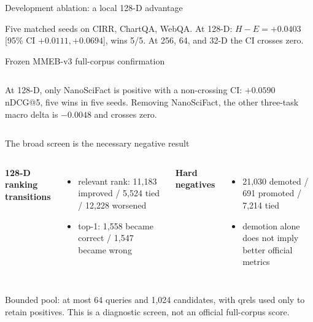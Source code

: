 \documentclass[aspectratio=169,10pt]{beamer}
\begin{document}
\begin{frame}{Development ablation: a local 128-D advantage}
\centering

\vspace{-0.8em}
\small Five matched seeds on CIRR, ChartQA, WebQA. At 128-D: $H-E=+0.0403$
[95\% CI $+0.0111,+0.0694$], wins 5/5. At 256, 64, and 32-D the CI crosses zero.
\end{frame}

\begin{frame}{Frozen MMEB-v3 full-corpus confirmation}
\begin{columns}[c]
\centering
{}
\centering\scriptsize
\vspace{0.8em}

\raggedright\small At 128-D, only NanoSciFact is positive with a non-crossing CI:
$+0.0590$ nDCG@5, five wins in five seeds. Removing NanoSciFact, the other three-task
macro delta is $-0.0048$ and crosses zero.
\end{columns}
\end{frame}

\begin{frame}{The broad screen is the necessary negative result}
\centering\small


\vspace{1em}
\begin{columns}[T]
\textbf{128-D ranking transitions}
\begin{itemize}
\item relevant rank: 11,183 improved / 5,524 tied / 12,228 worsened
\item top-1: 1,558 became correct / 1,547 became wrong
\end{itemize}
\textbf{Hard negatives}
\begin{itemize}
\item 21,030 demoted / 691 promoted / 7,214 tied
\item demotion alone does not imply better official metrics
\end{itemize}
\end{columns}
\vfill
\scriptsize Bounded pool: at most 64 queries and 1,024 candidates, with qrels used only
to retain positives. This is a diagnostic screen, not an official full-corpus score.
\end{frame}
\end{document}
